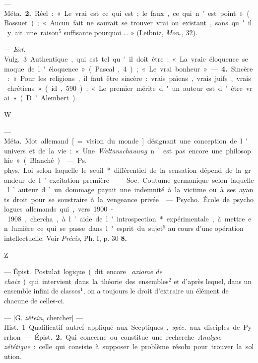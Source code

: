 \begin{itemize}[leftmargin=1cm, label=, itemsep=1pt]
— \si{Méta.}  {\bf 2.} Réel : « Le vrai est ce qui est ; le faux, ce qui
n’est point » (Bossuet) ; « Aucun fait ne saurait se trouver vrai ou
existant, sans qu'il y ait une raison$^5$ suffisante pourquoi … » (Leibniz,
{\it Mon.}, 32).

— {\it Ext.} \si{Vulg.} 3 Authentique, qui est tel qu'il doit être : « La
vraie éloquence se moque de l'éloquence » (Pascal, 4) ; « Le vrai bonheur ». —
{\bf 4.} Sincère : « Pour les religions, il faut être sincère : vrais
païens, vrais juifs, vrais chrétiens » (id, 590) ; « Le premier mérite d'un
auteur est d’être vrai » (D’Alembert).

\begin{center}
\huge{W}
\end{center}

 — \si{Méta.} Mot allemand [= vision du monde] désignant
une conception de l'univers et de la vie : « Une {\it Weltanschauung} n’est
pas encore une philosophie » (Blanché).

 — \si{Ps. phys.} Loi selon laquelle le seuil*
différentiel de la sensation dépend de la grandeur de l’excitation première.

 — \si{Soc.} Coutume germanique selon laquelle l’auteur d’un
dommage payait une indemnité à la victime ou à ses ayants droit pour se
soustraire à la vengeance privée.

 — \si{Psycho.} École de psychologues allemands qui,
vers 1900-1908, chercha, à l’aide de l'introspection* expérimentale, à mettre
en lumière ce qui se passe dans l'esprit du sujet$^5$ au cours d’une
opération intellectuelle. Voir {\it Précis}, Ph. I, p. 30 {\bf 8.}

\begin{center}
\huge{Z}
\end{center}

 — \si{Épist.} Postulat logique (dit encore {\it
axiome de choix}) qui intervient dans la théorie des ensembles$^2$ et d’après
lequel, dans un ensemble infini de classes$^1$, on a toujours le droit
d'extraire un élément de chacune de celles-ci.

 — [G. {\it zêtein}, chercher] — \si{Hist.} 1. Qualificatif
autref. appliqué aux Sceptiques, {\it spéc.} aux disciples de Pyrrhon. —
\si{Épist.} {\bf 2.} Qui concerne ou constitue une recherche. {\it Analyse
zététique} : celle qui consiste à supposer le problème résolu pour trouver la
solution.

	\end{itemize}
